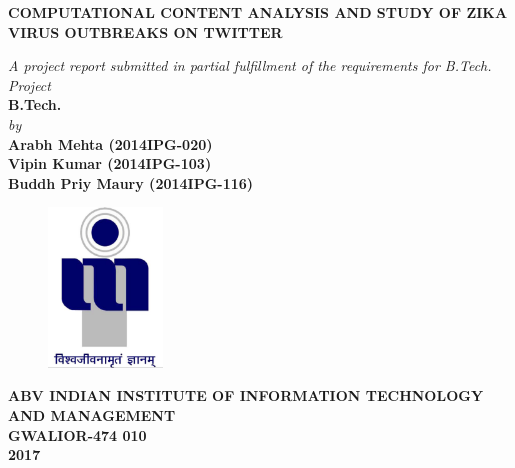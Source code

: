 \title{}
\author{}
\thispagestyle{empty}

\begin{titlepage}
\begin{center}
{\Large \bf{COMPUTATIONAL CONTENT ANALYSIS AND STUDY OF ZIKA VIRUS OUTBREAKS ON TWITTER}}
\end{center}
\vspace{0.6in}
\begin{center}
{\large \it{A project report submitted in partial fulfillment of the requirements for B.Tech. Project}} \\
\vspace{0.6in}
{\large \bf B.Tech.} \\
\vspace{0.5in}
{\large \it by\\}
\vspace{0.3in}
{\large \bf Arabh Mehta (2014IPG-020)}\\
{\large \bf Vipin Kumar (2014IPG-103)}\\
{\large \bf Buddh Priy Maury (2014IPG-116)}\\
\end{center}
\vspace{0.8in}
\begin{center}
\begin{figure}[h]
\centerline{\includegraphics[width=1.2in]{iiitm}}
\end{figure}
\end{center}
\begin{center}
{\Large \bf ABV INDIAN INSTITUTE OF INFORMATION TECHNOLOGY AND MANAGEMENT\\
GWALIOR-474 010\\}
\vspace{0.2in}
{\Large \bf 2017\\}
\end{center}
\end{titlepage}
